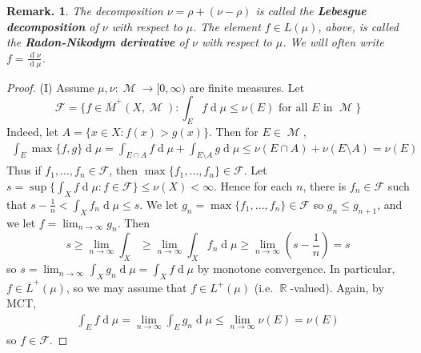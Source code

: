 \documentclass[12pt, a4paper]{memoir}
\DeclareMathOperator{\R}{{\mathbb{R}}}
\theoremstyle{nonumberplain}
\newtheorem{remark}{Remark.}
\newtheorem{proof}{Proof}
\DeclareMathOperator{\M}{\mathcal{M}}
\renewcommand{\d}[1]{\ensuremath{\operatorname{d}\!{#1}}} %
\begin{document}
\begin{remark}
    The decomposition $\nu=\rho+(\nu-\rho)$ is called the \textbf{Lebesgue decomposition} of $\nu$ with respect to $\mu$.
    The element $f\in L(\mu)$, above, is called the \textbf{Radon-Nikodym derivative} of $\nu$ with respect to $\mu$.
    We will often write $f=\frac{\d{\nu}}{\d{\mu}}$.
\end{remark}
\begin{proof}
    (I) Assume $\mu,\nu:\M\to[0,\infty)$ are finite measures.
    Let
    \begin{equation*}
        \mathcal{F}=\{f\in\overline{M}^+(X,\M):\int_E f\d{\mu}\leq\nu(E)\text{ for all $E$ in $\M$}\}
    \end{equation*}
    Indeed, let $A=\{x\in X:f(x)>g(x)\}$.
    Then for $E\in\M$,
    \begin{align*}
        \int_E\max\{f,g\}\d{\mu}=\int_{E\cap A}f\d{\mu}+\int_{E\setminus A} g\d{\mu}\leq \nu(E\cap A)+\nu(E\setminus A)=\nu(E)
    \end{align*}
    Thus if $f_1,\ldots,f_n\in\mathcal{F}$, then $\max\{f_1,\ldots,f_n\}\in\mathcal{F}$.
    Let $s=\sup\{\int_X f\d{\mu}:f\in\mathcal{F}\}\leq\nu(X)<\infty$.
    Hence for each $n$, there is $f_n\in\mathcal{F}$ such that $s-\frac{1}{n}<\int_X f_n\d{\mu}\leq s$.
    We let $g_n=\max\{f_1,\ldots,f_n\}\in\mathcal{F}$ so $g_n\leq g_{n+1}$, and we let $f=\lim_{n\to\infty}g_n$.
    Then
    \begin{equation*}
        s\geq\lim_{n\to\infty}\int_X \geq\lim_{n\to\infty}\int_X f_n\d{\mu}\geq\lim_{n\to\infty}\left(s-\frac{1}{n}\right)=s
    \end{equation*}
    so $s=\lim_{n\to\infty}\int_X g_n\d{\mu}=\int_X f\d{\mu}$ by monotone convergence.
    In particular, $f\in\overline{L}^+(\mu)$, so we may assume that $f\in L^+(\mu)$ (i.e. $\R$-valued).
    Again, by MCT,
    \begin{align*}
        \int_E f\d{\mu}=\lim_{n\to\infty}\int_E g_n\d{\mu}\leq\lim_{n\to\infty}\nu(E)=\nu(E)
    \end{align*}
    so $f\in\mathcal{F}$.


\end{proof}
\end{document}
